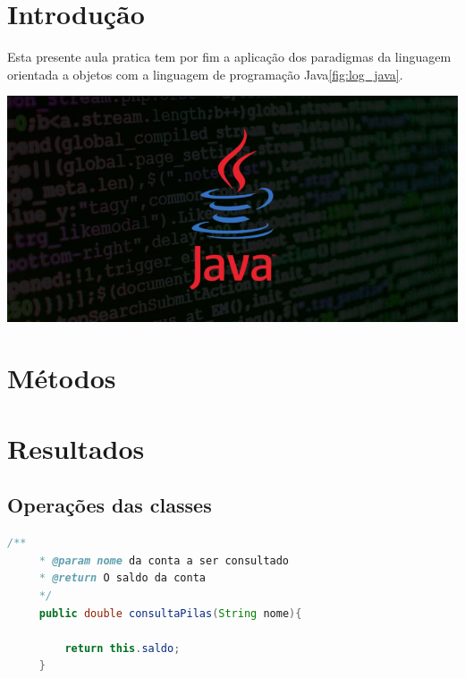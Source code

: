 
\section{Introdução}


\noindent \begin{minipage}[c]{0.6\textwidth}
  \vspace {1cm}
  \par Esta presente aula pratica tem por fim a aplicação dos paradigmas da linguagem orientada a objetos com a linguagem de programação Java\ref{fig:log_java}.

\end{minipage}
\begin{minipage}[c]{0.4\textwidth}

  \includegraphics[width=\textwidth]{figure/log_java.jpg}
  	\label{fig:log_java}
\end{minipage}


\section{Métodos}


\section{Resultados}






\subsection{Operações das classes}

\begin{lstlisting}[language=Java, caption=consultaPilas, label=consultaPilas]
    /**
     * @param nome da conta a ser consultado
     * @return O saldo da conta
     */
     public double consultaPilas(String nome){

         return this.saldo;
     }

\end{lstlisting}

